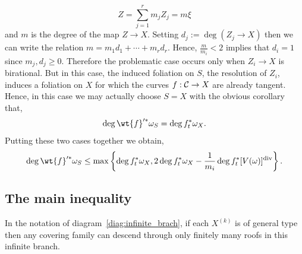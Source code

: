 \documentclass[main.tex]{subfiles}
\begin{document}
\[ Z = \sum_{j = 1}^r m_j Z_j = m \xi \]
and $m$ is the degree of the map $Z \to X$. Setting $d_j := \deg{(Z_j \to X)}$ then we can write the relation $m = m_1 d_1 + \cdots + m_r d_r$. Hence, $\frac{m}{m_i} < 2$ implies that $d_i = 1$ since $m_j, d_j \ge 0$. Therefore the problematic case occurs only when $Z_i \to X$ is birational. But in this case, the induced foliation on $S$, the resolution of $Z_i$, induces a foliation on $X$ for which the curves $f : \mathcal{C} \to X$ are already tangent. Hence, in this case we may actually choose $S = X$  
with the obvious corollary that,
\[ \deg{\wt{f}'^* \omega_S} = \deg{f_t^* \omega_{X}}. \]
Putting these two cases together we obtain,
\begin{equation} \label{eq:covering_canonical_degree_inequality_genus_lt_1}
\deg{\wt{f}'^* \omega_S}  \le \max \left \{ \deg{f_t^* \omega_{X}}, 2 \deg{f_t^* \omega_{X}} - \frac{1}{m_i} \deg{f_t^* [V(\omega)]^{\div}} \right \}.
\end{equation}

\subsection{The main inequality}

\begin{theorem}
In the notation of diagram~\ref{diag:infinite_brach}, if each $X^{(k)}$ is of general type then any covering family can descend through only finitely many roofs in this infinite branch. 
\end{theorem}
\end{document}
